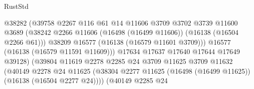 \begin{lexlean}{RustStd}
\begin{coremodule}
                                            @38282
                                            (@39758
                                              @2267
                                              @116
                                              @61
                                              @14
                                              @11606
                                              @3709
                                              @3702
                                              @3739
                                              @11600
                                              @3689
                                              (@38242
                                                @2266
                                                @11606
                                                (@16498 (@16499 @11606))
                                                (@16138 (@16504 @2266 @61)))
                                              @38209
                                              @16577
                                              (@16138 (@16579 @11601 @3709)))
                                            @16577
                                            (@16138 (@16579 @11591 @11609)))
                                          @17634
                                          @17637
                                          @17640
                                          @17644
                                          @17649
                                          @39128)
                                        (@39804
                                          @11619
                                          @2278
                                          @2285
                                          @24
                                          @3709
                                          @11625
                                          @3709
                                          @11632
                                          (@40149
                                            @2278
                                            @24
                                            @11625
                                            (@38304
                                              @2277
                                              @11625
                                              (@16498 (@16499 @11625))
                                              (@16138 (@16504 @2277 @24))))
                                          (@40149
                                            @2285
                                            @24

\end{coremodule}
\end{lexlean}
